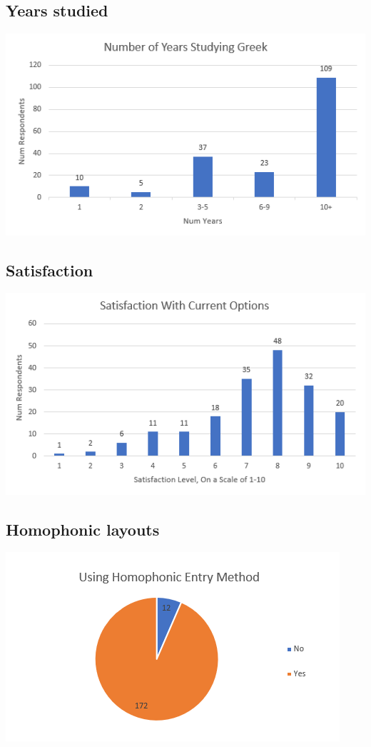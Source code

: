 \documentclass[11pt]{article}
\begin{document}
\subsection{Years studied}
\label{sec:orgb1c3546}

\begin{center}
\includegraphics[width=.9\linewidth]{./images/years-studied.PNG}
\end{center}

\subsection{Satisfaction}
\label{sec:org3e3c57a}

\begin{center}
\includegraphics[width=.9\linewidth]{./images/satisfaction.PNG}
\end{center}

\subsection{Homophonic layouts}
\label{sec:orgb4d24d8}

\begin{center}
\includegraphics[width=.9\linewidth]{./images/homophonic.PNG}
\end{center}
\end{document}
